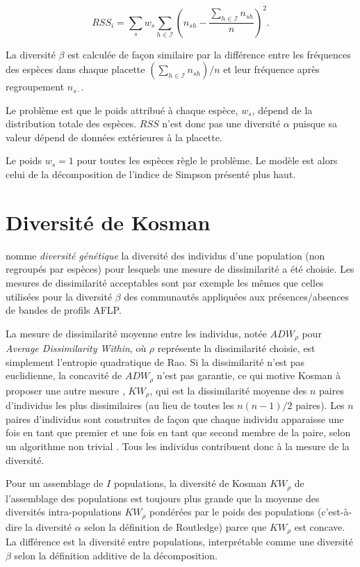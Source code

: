 \documentclass[
  11pt,
  french,
  a4paper,
  extrafontsizes,onecolumn,openright
  ]{memoir}
\begin{document}
\begin{equation}
  \mathit{RSS}_i = \sum_s{w_s\sum_{h\in {\mathcal I}}{{\left(n_{sh} - \frac{\sum_{h\in {\mathcal I}}{n_{sh}}}{n}\right)}^2}}.
\end{equation}

La diversité \(\beta\) est calculée de façon similaire par la différence entre les fréquences des espèces dans chaque placette \({\left(\sum_{h\in {\mathcal I}}{n_{sh}}\right)}/{n}\) et leur fréquence après regroupement \(n_{s\cdot}\).

Le problème est que le poids attribué à chaque espèce, \(w_s\), dépend de la distribution totale des espèces.
\(\mathit{RSS}\) n'est donc pas une diversité \(\alpha\) puisque sa valeur dépend de données extérieures à la placette.

Le poids \(w_s=1\) pour toutes les espèces règle le problème.
Le modèle est alors celui de la décomposition de l'indice de Simpson présenté plus haut.

\section{Diversité de Kosman}\label{diversituxe9-de-kosman}

\textcite{Kosman2013} nomme \emph{diversité génétique} la diversité des individus d'une population (non regroupés par espèces) pour lesquels une mesure de dissimilarité a été choisie.
Les mesures de dissimilarité acceptables \autocite{Kosman2005} sont par exemple les mêmes que celles utilisées pour la diversité \(\beta\) des communautés appliquées aux présences/absences de bandes de profils AFLP.

La mesure de dissimilarité moyenne entre les individus, notée \(ADW_{\rho}\) pour \emph{Average Dissimilarity Within}, où \(\rho\) représente la dissimilarité choisie, est simplement l'entropie quadratique de Rao.
Si la dissimilarité n'est pas euclidienne, la concavité de \(ADW_{\rho}\) n'est pas garantie, ce qui motive Kosman à proposer une autre mesure \autocite{Kosman1996,Kosman2007}, \({KW}_{\rho}\), qui est la dissimilarité moyenne des \(n\) paires d'individus les plus dissimilaires (au lieu de toutes les \({n(n-1)}/{2}\) paires).
Les \(n\) paires d'individus sont construites de façon que chaque individu apparaisse une fois en tant que premier et une fois en tant que second membre de la paire, selon un algorithme non trivial \autocite{Bellman1970}.
Tous les individus contribuent donc à la mesure de la diversité.

Pour un assemblage de \(I\) populations, la diversité de Kosman \({KW}_{\rho}\) de l'assemblage des populations est toujours plus grande que la moyenne des diversités intra-populations \({KW}_{\rho}\) pondérées par le poids des populations (c'est-à-dire la diversité \(\alpha\) selon la définition de Routledge) parce que \({KW}_{\rho}\) est concave.
La différence est la diversité entre populations, interprétable comme une diversité \(\beta\) selon la définition additive de la décomposition.
\end{document}
